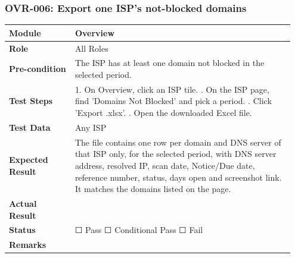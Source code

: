 \documentclass[10pt]{article}
\begin{document}
\subsubsection*{OVR-006: Export one ISP's not-blocked domains}
\begin{longtable}{p{0.22\linewidth}p{0.73\linewidth}}
\hline
\textbf{Module} & Overview \\ \hline
\textbf{Role} & All Roles \\ \hline
\textbf{Pre-condition} & The ISP has at least one domain not blocked in the selected period. \\ \hline
\textbf{Test Steps} & 1. On Overview, click an ISP tile. \newline 2. On the ISP page, find 'Domains Not Blocked' and pick a period. \newline 3. Click 'Export .xlsx'. \newline 4. Open the downloaded Excel file. \\ \hline
\textbf{Test Data} & Any ISP \\ \hline
\textbf{Expected Result} & The file contains one row per domain and DNS server of that ISP only, for the selected period, with DNS server address, resolved IP, scan date, Notice/Due date, reference number, status, days open and screenshot link. It matches the domains listed on the page. \\ \hline
\textbf{Actual Result} & \newline \newline \\ \hline
\textbf{Status} & ☐ Pass \quad ☐ Conditional Pass \quad ☐ Fail \\ \hline
\textbf{Remarks} & \newline \\ \hline
\end{longtable}
\end{document}

